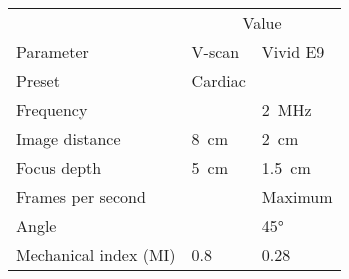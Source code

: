 \documentclass[b5paper, twoside, titlepage, 10pt]{article}
\begin{document}
\setcounter{equation}{41}
\begin{tabular}{@{}l l l @{}}
\toprule
& \multicolumn{2}{c}{Value} \\ \cmidrule(r){2-3}
Parameter & V-scan & Vivid E9\\
\midrule
Preset & Cardiac & \\
Frequency & & \SI{2}{\mega\hertz}\\
Image distance & \SI{8}{\centi\meter} & \SI{2}{\centi\meter}\\
Focus depth & \SI{5}{\centi\meter} & \SI{1.5}{\centi\meter}\\
Frames per second & &Maximum\\
Angle & & \ang{45}\\
Mechanical index (MI) & \num{0.8} & \num{0.28} \\
  \bottomrule
\end{tabular}
\end{document}
